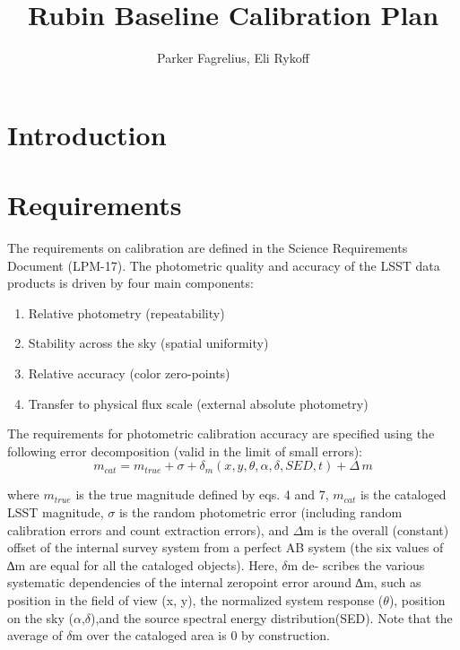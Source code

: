 \documentclass[SE,authoryear,toc]{article}
\title{Rubin Baseline Calibration Plan}
\author{%
Parker Fagrelius, Eli Rykoff
}
\date{\vcsDate}
\begin{document}
\maketitle


\appendix

\section{Introduction}

\section{Requirements}
The requirements on calibration are defined in the Science Requirements Document (LPM-17). The photometric quality and accuracy of the LSST data products is driven by four main components:
\begin{enumerate}
    \item Relative photometry (repeatability)
    \item Stability across the sky (spatial uniformity)
    \item Relative accuracy (color zero-points)
    \item Transfer to physical flux scale (external absolute photometry)
\end{enumerate}

The requirements for photometric calibration accuracy are specified using the following error decomposition (valid in the limit of small errors):
\begin{equation}
    m_{cat} = m_{true} +\sigma+\delta_{m} (x,y,\theta,\alpha,\delta,SED,t)+\Delta\,m
\end{equation}

where $m_{true}$ is the true magnitude defined by eqs. 4 and 7, $m_{cat}$ is the cataloged LSST magnitude, $\sigma$ is the random photometric error (including random calibration errors and count extraction errors), and $\Delta$m is the overall (constant) offset of the internal survey system from a perfect AB system (the six values of ∆m are equal for all the cataloged objects). 
Here, $\delta$m de- scribes the various systematic dependencies of the internal zeropoint error around ∆m, such as position in the field of view (x, y), the normalized system response ($\theta$), position on the sky ($\alpha$,$\delta$),and the source spectral energy distribution(SED).
Note that the average of $\delta$m over the cataloged area is 0 by construction.
\end{document}
